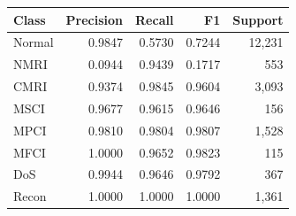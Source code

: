 \begin{tabular}{lrrrr}
\toprule
Class & Precision & Recall & F1 & Support \\
\midrule
Normal & 0.9847 & 0.5730 & 0.7244 & 12,231 \\
NMRI & 0.0944 & 0.9439 & 0.1717 & 553 \\
CMRI & 0.9374 & 0.9845 & 0.9604 & 3,093 \\
MSCI & 0.9677 & 0.9615 & 0.9646 & 156 \\
MPCI & 0.9810 & 0.9804 & 0.9807 & 1,528 \\
MFCI & 1.0000 & 0.9652 & 0.9823 & 115 \\
DoS & 0.9944 & 0.9646 & 0.9792 & 367 \\
Recon & 1.0000 & 1.0000 & 1.0000 & 1,361 \\
\bottomrule
\end{tabular}
